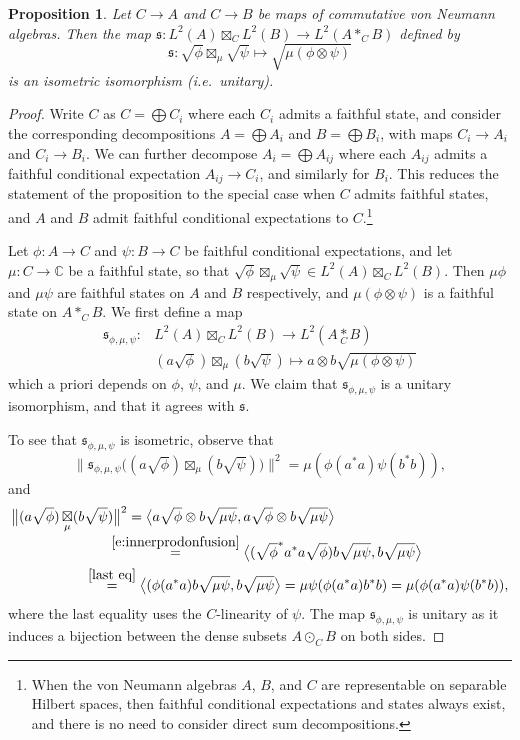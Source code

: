 \documentclass[10pt,a4paper]{amsart}
\newtheorem{proposition}{Proposition}
\newcommand{\Ltwomap}{\mathfrak{s}}
\newcommand{\cofu}[1]{\mathop{\boxtimes}_{#1}}
\newcommand{\rar}{\rightarrow}
\newcommand{\tens}[1]{\mathop{*}\limits_{#1}}
\begin{document}
\begin{proposition}\label{prop:tensstandard}
Let $C\rar A$ and $C\rar B$ be maps of commutative von Neumann algebras. Then the map $\Ltwomap\colon 	L^2(A)\cofu{C}L^2(B) \rar  L^2(A\ast_{C}B)$ defined by
	$$
	\Ltwomap\colon 	\sqrt{\phi} \cofu{\mu}\sqrt{\psi} \mapsto 	\sqrt{\mu (\phi \otimes \psi)}
	$$
	is an isometric isomorphism (i.e.~unitary).
\end{proposition}

\begin{proof}
Write $C$ as $C=\bigoplus C_i$ where each $C_i$ admits a faithful state, and consider the corresponding decompositions $A=\bigoplus A_i$ and $B=\bigoplus B_i$, with maps $C_i \rar A_i$ and $C_i \rar B_i$. We can further decompose $A_i=\bigoplus A_{ij}$ where each $A_{ij}$ admits a faithful conditional expectation $A_{ij} \rar C_i$, and similarly for $B_i$.
This reduces the statement of the proposition to the special case when $C$ admits faithful states, and $A$ and $B$ admit faithful conditional expectations to $C$.\footnote{When the von Neumann algebras $A$, $B$, and $C$ are representable on separable Hilbert spaces, then faithful conditional expectations and states always exist, and there is no need to consider direct sum decompositions.}

Let $\phi:A\to C$ and $\psi:B\to C$ be faithful conditional expectations, and let $\mu:C\to \mathbb C$ be a faithful state, so that
$\sqrt{\phi} \cofu{\mu}\sqrt{\psi}\in L^2(A)\cofu{C}L^2(B)$. Then $\mu \phi$ and $\mu \psi$ are faithful states on $A$ and $B$ respectively, and $\mu(\phi \otimes\psi)$ is a faithful state on $A \ast_{ C} B$.
We first define a map
\begin{align*}
     \Ltwomap_{\phi,\mu,\psi}\colon& L^2(A)\cofu{C}L^2(B) \rar  L^2(A\tens{C}B)\\
    & (a\sqrt{\phi})\cofu{\mu}(b\sqrt{\psi})\mapsto a\otimes b \sqrt{\mu (\phi \otimes \psi)}
\end{align*}
which a priori depends on $\phi$, $\psi$, and $\mu$.
We claim that $\Ltwomap_{\phi,\mu,\psi}$ is a unitary isomorphism, and that it agrees with $\Ltwomap$.

To see that $ \Ltwomap_{\phi,\mu,\psi}$ is isometric, observe that
$$
\big\|\Ltwomap_{\phi,\mu,\psi}\big((a\sqrt{\phi})\cofu{\mu}(b\sqrt{\psi})\big)\big\|^2=\mu (\phi(a^*a)\psi(b^*b)),
$$
and
\begin{align*}
\big\|(a\sqrt{\phi})\cofu{\mu}(b&\sqrt{\psi})\big\|^2 =
\big\langle
a\sqrt{\phi}\otimes b\sqrt{\mu\psi},a\sqrt{\phi}\otimes b\sqrt{\mu\psi}
\big\rangle
\\[-1mm]
&\quad\,\,\,\,\stackrel{\eqref{e:innerprodonfusion}}=
\big\langle
(\sqrt{\phi}^*a^*a\sqrt{\phi}) b\sqrt{\mu\psi}, b\sqrt{\mu\psi}
\big\rangle
\\&\stackrel{\eqref{last eq}}=
\big\langle
(\phi(a^*a) b\sqrt{\mu\psi}, b\sqrt{\mu\psi}
\big\rangle
=
\mu\psi(\phi(a^*a)b^*b)=\mu (\phi(a^*a)\psi(b^*b)),
\end{align*}
where the last equality uses the $C$-linearity of $\psi$. The map $\Ltwomap_{\phi,\mu,\psi}$ is unitary as it induces a bijection between the dense subsets $A\odot_C B$ on both sides.


\end{proof}
\end{document}
